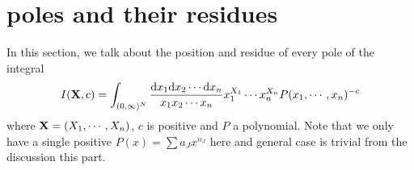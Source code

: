 \documentclass[12pt]{article}
\theoremstyle{definition}
\theoremstyle{plain}
\begin{document}



\section{poles and their residues}
In this section, we talk about the position and residue of every pole of the integral 
\begin{equation}
I({\bf X},c)=\int_{(0,\infty)^N}\frac{{\text d} x_1{\text d}x_2\cdots{\text d}x_n}{x_1x_2\cdots x_n}x_1^{X_1}\cdots x_n^{X_n}P(x_1,\cdots,x_n)^{-c}
\end{equation}
where ${\bf X}=(X_1,\cdots,X_n)$, $c$ is positive and $P$ a polynomial. Note that we only have a single positive $P(x)=\sum a_Jx^{n_J}$ here and general case is trivial from the discussion this part.
\end{document}
